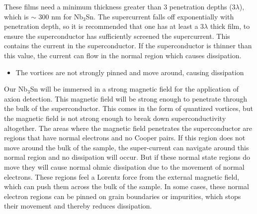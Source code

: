         These films need a minimum thickness greater than 3 penetration depths ($3\lambda$), which is $\sim$ 300 nm for Nb$_3$Sn. The supercurrent falls off exponentially with penetration depth, so it is recommended that one has at least a $3\lambda$ thick film, to ensure the superconductor has sufficiently screened the supercurrent. This contains the current in the superconductor. If the superconductor is thinner than this value, the current can flow in the normal region which causes dissipation.
        
        \begin{itemize}
            \item The vortices are not strongly pinned and move around, causing dissipation
        \end{itemize}
        
        Our Nb$_3$Sn will be immersed in a strong magnetic field for the application of axion detection. This magnetic field will be strong enough to penetrate through the bulk of the superconductor. This comes in the form of quantized vortices, but the magnetic field is not strong enough to break down superconductivity altogether. The areas where the magnetic field penetrates the superconductor are regions that have normal electrons and no Cooper pairs. If this region does not move around the bulk of the sample, the super-current can navigate around this normal region and no dissipation will occur. But if these normal state regions do move they will cause normal ohmic dissipation due to the movement of normal electrons. These regions feel a Lorentz force from the external magnetic field, which can push them across the bulk of the sample. In some cases, these normal electron regions can be pinned on grain boundaries or impurities, which stops their movement and thereby reduces dissipation. 
  
        
 
